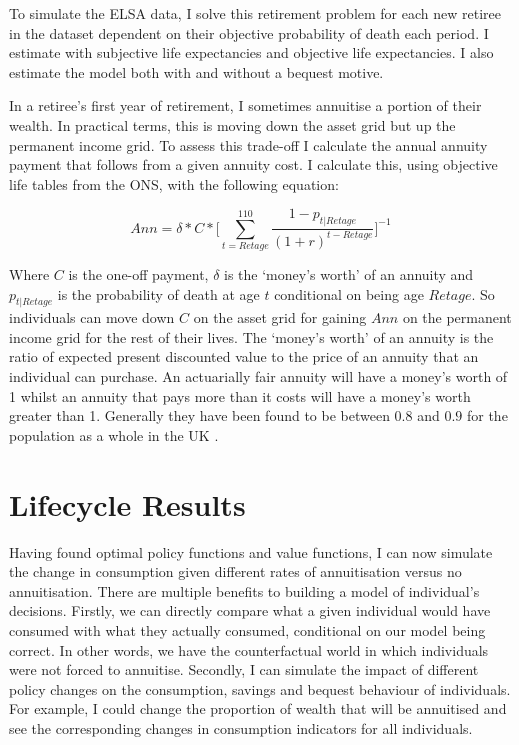 \documentclass[12pt]{article}
\begin{document}
To simulate the ELSA data, I solve this retirement problem for each new retiree
in the dataset dependent on their objective probability of death each period. I
estimate with subjective life expectancies and objective life expectancies. I
also estimate the model both with and without a bequest motive.


In a retiree's first year of retirement, I sometimes annuitise a portion of
their wealth. In practical terms, this is moving down the asset grid but up the
permanent income grid. To assess this trade-off I calculate the annual annuity
payment that follows from a given annuity cost. I calculate this, using
objective life tables from the ONS, with the following equation:

\begin{equation*}
    Ann = \delta * C * \biggl[\sum_{t = Retage}^{110}\frac{1 - p_{t|Retage}}{(1 + r)^{t - Retage}}\biggr]^{-1}
\end{equation*}

Where $C$ is the one-off payment, $\delta$ is the `money's worth' of an annuity
and $p_{t|Retage}$ is the probability of death at age $t$ conditional on being
age $Retage$. So individuals can move down $C$ on the asset grid for gaining
$Ann$ on the permanent income grid for the rest of their lives. The `money's
worth' of an annuity is the ratio of expected present discounted value to the
price of an annuity that an individual can purchase. An actuarially fair annuity
will have a money's worth of 1 whilst an annuity that pays more than it costs
will have a money's worth greater than 1. Generally they have been found to be
between $0.8$ and $0.9$ for the population as a whole in the UK
\citep{finkelstein_porteba_2002, finkelstein_porteba_2004, mitchell_et_al_1999}.

\section{Lifecycle Results}

Having found optimal policy functions and value functions, I can now simulate the
change in consumption given different rates of annuitisation versus no
annuitisation. There are multiple benefits to building a model of individual's
decisions. Firstly, we can directly compare what a given individual would have
consumed with what they actually consumed, conditional on our model being
correct. In other words, we have the counterfactual world in which individuals
were not forced to annuitise. Secondly, I can simulate the impact of different
policy changes on the consumption, savings and bequest behaviour of individuals.
For example, I could change the proportion of wealth that will be annuitised and
see the corresponding changes in consumption indicators for all individuals.
\end{document}
